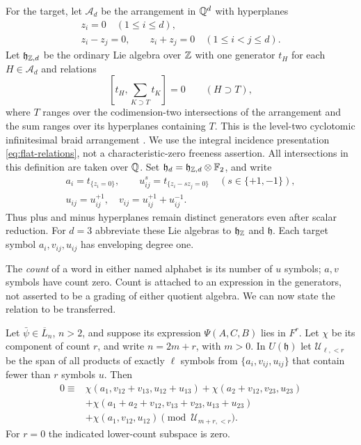 For the target, let $\mathcal A_d$ be the arrangement in $\mathbb Q^d$ with
hyperplanes
\[
 \begin{gathered}
 z_i=0\quad(1\leq i\leq d),\\
 z_i-z_j=0,\qquad z_i+z_j=0\quad(1\leq i<j\leq d).
 \end{gathered}
\]
Let $\mathfrak h_{\mathbb Z,d}$ be the ordinary Lie algebra over $\mathbb Z$ with
one generator $t_H$ for each $H\in\mathcal A_d$ and relations
\begin{equation}\label{eq:flat-relations}
 \left[t_H,\sum_{K\supset T}t_K\right]=0
 \qquad(H\supset T),
\end{equation}
where $T$ ranges over the codimension-two intersections of the
arrangement and the sum ranges over its hyperplanes containing $T$.
This is the level-two cyclotomic infinitesimal braid arrangement
\cite[Section~1.4]{Enriquez}.  We use the integral incidence
presentation \eqref{eq:flat-relations}, not a characteristic-zero
freeness assertion.
All intersections in this definition are taken over $\mathbb Q$.
Set $\mathfrak h_d=\mathfrak h_{\mathbb Z,d}\otimes{\mathbb F_2}$, and write
\[
 \begin{gathered}
 a_i=t_{\{z_i=0\}},\qquad
 u_{ij}^s=t_{\{z_i-sz_j=0\}}\quad(s\in\{+1,-1\}),\\
 u_{ij}=u_{ij}^{+1},\quad v_{ij}=u_{ij}^{+1}+u_{ij}^{-1}.
 \end{gathered}
\]
Thus plus and minus hyperplanes remain distinct generators even after
scalar reduction.  For $d=3$ abbreviate these Lie algebras to
$\mathfrak h_\mathbb Z$ and $\mathfrak h$.  Each target symbol $a_i,v_{ij},u_{ij}$
has enveloping degree one.

The \emph{count} of a word in either named alphabet is its number of
$u$ symbols; $a,v$ symbols have count zero.  Count is attached to an
expression in the generators, not asserted to be a grading of either
quotient algebra.  We can now state the relation to be transferred.

\begin{proposition}\label{prop:leading-pentagon}
Let $\bar\psi\in\overline L_n$, $n>2$, and suppose its expression
$\Psi(A,C,B)$ lies in $F^r$.  Let $\chi$ be its component of count $r$,
and write $n=2m+r$, with $m>0$.  In $U(\mathfrak h)$ let
$\mathcal U_{\ell,<r}$ be the span of all products of exactly $\ell$
symbols from $\{a_i,v_{ij},u_{ij}\}$ that contain fewer than $r$
symbols $u$.  Then
\begin{equation}\label{eq:leading-pentagon}
\begin{split}
 0\equiv{}&\chi(a_1,v_{12}+v_{13},u_{12}+u_{13})
       +\chi(a_2+v_{12},v_{23},u_{23})\\
 &+\chi(a_1+a_2+v_{12},v_{13}+v_{23},u_{13}+u_{23})\\
 &+\chi(a_1,v_{12},u_{12})\pmod{\mathcal U_{m+r,<r}}.
\end{split}
\end{equation}
For $r=0$ the indicated lower-count subspace is zero.
\end{proposition}

